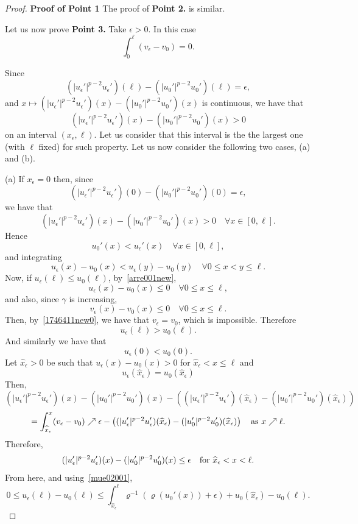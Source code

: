 \documentclass[10pt,a4paper]{amsart}
\begin{document}
\begin{proof}  {\bf Proof of Point 1}
The proof of {\bf Point 2.} is similar.

 Let us now prove {\bf Point 3.}  Take $\epsilon>0$. 
In this case   \begin{equation}\label{1746411new0}
\int_0^\ell (v_\epsilon-v_0)=0.
\end{equation}

 Since
$$(|u_\epsilon'|^{p-2}u_\epsilon')(\ell)-(|u_0'|^{p-2}u_0')(\ell)=\epsilon,$$
 and $x\mapsto (|u_\epsilon'|^{p-2}u_\epsilon')(x)-(|u_0'|^{p-2}u_0')(x)$ is continuous, we have that
$$(|u_\epsilon'|^{p-2}u_\epsilon')(x)-(|u_0'|^{p-2}u_0')(x)>0$$
on an interval $(x_\epsilon,\ell)$. Let us consider that this interval is the  the largest one (with $\ell$ fixed) for such property.  Let us now  consider the following two cases, (a) and (b).

\noindent (a) If $x_\epsilon=0$ then, since
  $$(|u_\epsilon'|^{p-2}u_\epsilon')(0)-(|u_0'|^{p-2}u_0')(0)=\epsilon,$$  
  we have that
$$(|u_\epsilon'|^{p-2}u_\epsilon')(x)-(|u_0'|^{p-2}u_0')(x)>0\quad\forall x\in[0,\ell].$$
Hence 
\begin{equation}\label{arre002new} u_0'(x) <u_\epsilon'(x)\quad\forall x\in[0,\ell],
\end{equation}
and integrating  
\begin{equation}\label{arre001new}   u_\epsilon(x)-u_0(x)< u_\epsilon(y)-u_0(y)\quad\forall 0\le x<y\le\ell.
\end{equation}
Now, if  $u_\epsilon(\ell)\le u_0(\ell)$,  by~\eqref{arre001new},
$$u_\epsilon(x)-u_0(x)\le 0\quad\forall 0\le x \le\ell,$$
and also, since $\gamma$ is increasing, 
$$v_\epsilon(x)-v_0(x)\le 0 \quad\forall 0\le x \le\ell.$$
Then, by~\eqref{1746411new0},
we have that $v_\epsilon=v_0$, which is impossible. Therefore 
$$u_\epsilon(\ell) >u_0(\ell).$$
And similarly we have that 
$$u_\epsilon(0) <u_0(0).$$
Let $\widehat x_\epsilon>0$  be such that $u_\epsilon(x)-u_0(x)>0$ for  $\widehat x_\epsilon<x\le \ell$
and  
\begin{equation}\label{mue02001}u_\epsilon(\widehat x_\epsilon)=u_0(\widehat x_\epsilon)
\end{equation}
Then, 
$$(|u_\epsilon'|^{p-2}u_\epsilon')(x)-(|u_0'|^{p-2}u_0')(x)-\left((|u_\epsilon'|^{p-2}u_\epsilon')(\widehat x_\epsilon)-(|u_0'|^{p-2}u_0')(\widehat x_\epsilon)\right)$$
$$= \int_{\widehat x_\epsilon}^x(v_\epsilon-v_0) \nearrow \epsilon-\left((|u_\epsilon'|^{p-2}u_\epsilon')(\widehat x_\epsilon)-(|u_0'|^{p-2}u_0')(\widehat x_\epsilon)\right) \quad \hbox{as } x\nearrow \ell.$$
Therefore,
$$(|u_\epsilon'|^{p-2}u_\epsilon')(x)-(|u_0'|^{p-2}u_0')(x)\le  \epsilon \quad \hbox{for } \widehat x_\epsilon<x<\ell.$$
From here, and using~\eqref{mue02001},
\begin{equation}\label{simcas01001}
0\le u_\epsilon(\ell)-u_0(\ell)\le \int_{\widehat x_\epsilon}^\ell\varrho^{-1}\left(\varrho(u_0'(x))+\epsilon\right)+u_0(\widehat x_\epsilon)-u_0(\ell).
\end{equation}



\end{proof}
\end{document}
